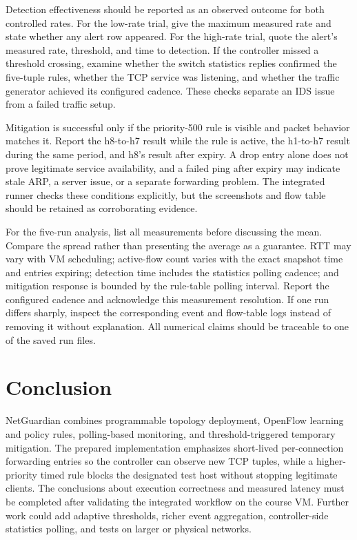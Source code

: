\documentclass[conference]{IEEEtran}
\begin{document}
Detection effectiveness should be reported as an observed outcome for both controlled rates. For the low-rate trial, give the maximum measured rate and state whether any alert row appeared. For the high-rate trial, quote the alert's measured rate, threshold, and time to detection. If the controller missed a threshold crossing, examine whether the switch statistics replies confirmed the five-tuple rules, whether the TCP service was listening, and whether the traffic generator achieved its configured cadence. These checks separate an IDS issue from a failed traffic setup.

Mitigation is successful only if the priority-500 rule is visible and packet behavior matches it. Report the h8-to-h7 result while the rule is active, the h1-to-h7 result during the same period, and h8's result after expiry. A drop entry alone does not prove legitimate service availability, and a failed ping after expiry may indicate stale ARP, a server issue, or a separate forwarding problem. The integrated runner checks these conditions explicitly, but the screenshots and flow table should be retained as corroborating evidence.

For the five-run analysis, list all measurements before discussing the mean. Compare the spread rather than presenting the average as a guarantee. RTT may vary with VM scheduling; active-flow count varies with the exact snapshot time and entries expiring; detection time includes the statistics polling cadence; and mitigation response is bounded by the rule-table polling interval. Report the configured cadence and acknowledge this measurement resolution. If one run differs sharply, inspect the corresponding event and flow-table logs instead of removing it without explanation. All numerical claims should be traceable to one of the saved run files.

\section{Conclusion}
NetGuardian combines programmable topology deployment, OpenFlow learning and policy rules, polling-based monitoring, and threshold-triggered temporary mitigation. The prepared implementation emphasizes short-lived per-connection forwarding entries so the controller can observe new TCP tuples, while a higher-priority timed rule blocks the designated test host without stopping legitimate clients. The conclusions about execution correctness and measured latency must be completed after validating the integrated workflow on the course VM. Further work could add adaptive thresholds, richer event aggregation, controller-side statistics polling, and tests on larger or physical networks.
\end{document}
